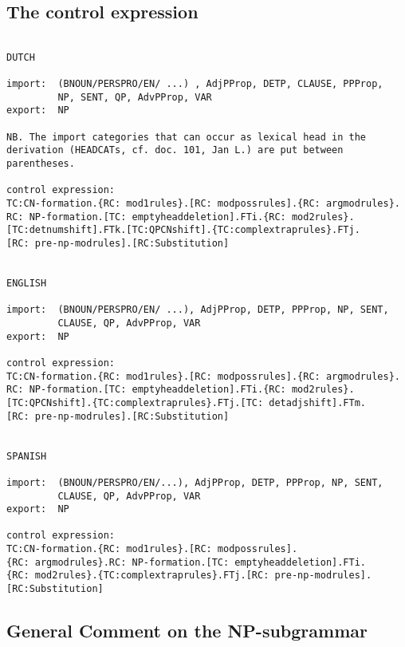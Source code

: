 \subsection{The control expression}
\begin{verbatim}

DUTCH

import:  (BNOUN/PERSPRO/EN/ ...) , AdjPProp, DETP, CLAUSE, PPProp, 
         NP, SENT, QP, AdvPProp, VAR
export:  NP

NB. The import categories that can occur as lexical head in the 
derivation (HEADCATs, cf. doc. 101, Jan L.) are put between 
parentheses.

control expression: 
TC:CN-formation.{RC: mod1rules}.[RC: modpossrules].{RC: argmodrules}.
RC: NP-formation.[TC: emptyheaddeletion].FTi.{RC: mod2rules}.
[TC:detnumshift].FTk.[TC:QPCNshift].{TC:complextraprules}.FTj.
[RC: pre-np-modrules].[RC:Substitution]


ENGLISH

import:  (BNOUN/PERSPRO/EN/ ...), AdjPProp, DETP, PPProp, NP, SENT, 
         CLAUSE, QP, AdvPProp, VAR
export:  NP

control expression:
TC:CN-formation.{RC: mod1rules}.[RC: modpossrules].{RC: argmodrules}.
RC: NP-formation.[TC: emptyheaddeletion].FTi.{RC: mod2rules}.
[TC:QPCNshift].{TC:complextraprules}.FTj.[TC: detadjshift].FTm.
[RC: pre-np-modrules].[RC:Substitution]


SPANISH

import:  (BNOUN/PERSPRO/EN/...), AdjPProp, DETP, PPProp, NP, SENT, 
         CLAUSE, QP, AdvPProp, VAR
export:  NP

control expression:
TC:CN-formation.{RC: mod1rules}.[RC: modpossrules].
{RC: argmodrules}.RC: NP-formation.[TC: emptyheaddeletion].FTi.
{RC: mod2rules}.{TC:complextraprules}.FTj.[RC: pre-np-modrules].
[RC:Substitution] 
\end{verbatim}

\subsection{General Comment on the NP-subgrammar}

